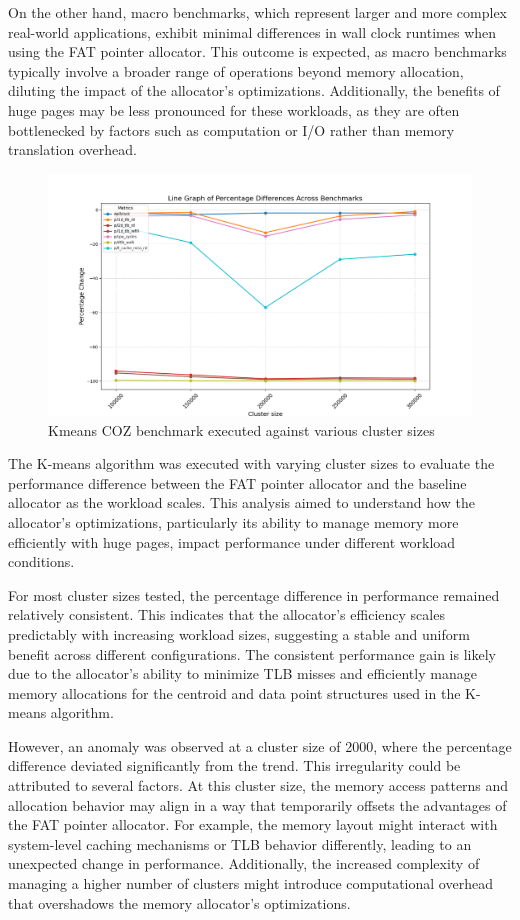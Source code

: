 \documentclass[11pt]{article}
\begin{document}
On the other hand, macro benchmarks, which represent larger and more complex real-world applications, 
exhibit minimal differences in wall clock runtimes when using the FAT pointer allocator. 
This outcome is expected, as macro benchmarks typically involve a broader range of operations 
beyond memory allocation, diluting the impact of the allocator's optimizations. Additionally, 
the benefits of huge pages may be less pronounced for these workloads, as they are often 
bottlenecked by factors such as computation or I/O rather than memory translation overhead.

\begin{figure}[htbp]
\centering
\includegraphics[width=.9\linewidth]{./diagrams/kmeans.png}
\caption{\label{fig:org8683315}Kmeans COZ benchmark executed against various cluster sizes}
\end{figure}

The K-means algorithm was executed with varying cluster sizes to evaluate the performance difference 
between the FAT pointer allocator and the baseline allocator as the workload scales. This analysis 
aimed to understand how the allocator's optimizations, particularly its ability to manage memory 
more efficiently with huge pages, impact performance under different workload conditions.

For most cluster sizes tested, the percentage difference in performance remained relatively 
consistent. This indicates that the allocator's efficiency scales predictably with increasing 
workload sizes, suggesting a stable and uniform benefit across different configurations. The 
consistent performance gain is likely due to the allocator's ability to minimize TLB misses 
and efficiently manage memory allocations for the centroid and data point structures used in 
the K-means algorithm.

However, an anomaly was observed at a cluster size of 2000, where the percentage difference 
deviated significantly from the trend. This irregularity could be attributed to several factors. 
At this cluster size, the memory access patterns and allocation behavior may align in a way that 
temporarily offsets the advantages of the FAT pointer allocator. For example, the memory layout 
might interact with system-level caching mechanisms or TLB behavior differently, leading to an 
unexpected change in performance. Additionally, the increased complexity of managing a higher 
number of clusters might introduce computational overhead that overshadows the memory allocator's 
optimizations.
\end{document}
